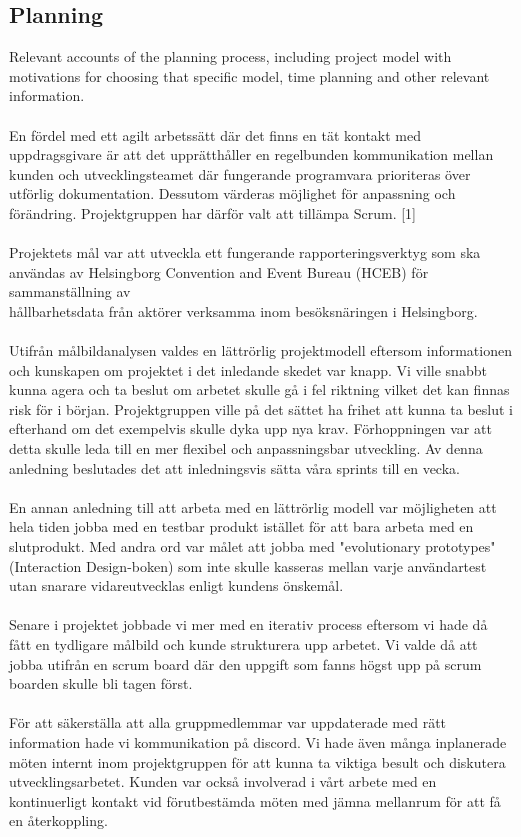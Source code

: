 \documentclass[12pt]{article}
\begin{document}
\subsection{Planning}
Relevant accounts of the planning process, including project model with motivations for choosing that specific model, time planning and other relevant information.\\\\
En fördel med ett agilt arbetssätt där det finns en tät kontakt med uppdragsgivare är att det upprätthåller en regelbunden kommunikation mellan kunden och utvecklingsteamet där fungerande programvara prioriteras över utförlig dokumentation. Dessutom värderas möjlighet för anpassning och förändring. Projektgruppen har därför valt att tillämpa Scrum. [1] \\\\
Projektets mål var att utveckla ett fungerande rapporteringsverktyg som ska användas av Helsingborg Convention and Event Bureau (HCEB) för sammanställning av \\ hållbarhetsdata från aktörer verksamma inom besöksnäringen i Helsingborg. \\\\
Utifrån målbildanalysen valdes en lättrörlig projektmodell eftersom informationen och kunskapen om projektet i det inledande skedet var knapp. Vi ville snabbt kunna agera och ta beslut om arbetet skulle gå i fel riktning vilket det kan finnas risk för i början. Projektgruppen ville på det sättet ha frihet att kunna ta beslut i efterhand om det exempelvis skulle dyka upp nya krav. Förhoppningen var att detta skulle leda till en mer flexibel och anpassningsbar utveckling. Av denna anledning beslutades det att inledningsvis sätta våra sprints till en vecka. \\\\ 
En annan anledning till att arbeta med en lättrörlig modell var möjligheten att hela tiden jobba med en testbar produkt istället för att bara arbeta med en slutprodukt. Med andra ord var målet att jobba med "evolutionary prototypes" (Interaction Design-boken) som inte skulle kasseras mellan varje användartest utan snarare vidareutvecklas enligt kundens önskemål.\\\\
Senare i projektet jobbade vi mer med en iterativ process eftersom vi hade då fått en tydligare målbild och kunde strukturera upp arbetet. Vi valde då att jobba utifrån en scrum board där den uppgift som fanns högst upp på scrum boarden skulle bli tagen först. \\\\
För att säkerställa att alla gruppmedlemmar var uppdaterade med rätt information hade vi kommunikation på discord. Vi hade även många inplanerade möten internt inom projektgruppen för att kunna ta viktiga besult och diskutera utvecklingsarbetet. Kunden var också involverad i vårt arbete med en kontinuerligt kontakt vid förutbestämda möten med jämna mellanrum för att få en återkoppling.  
\end{document}
